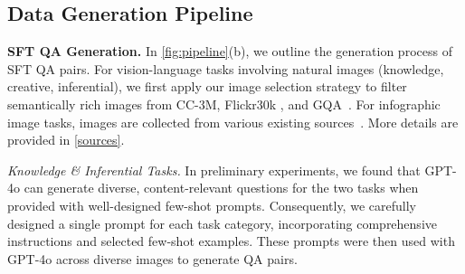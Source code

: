 
\subsection{Data Generation Pipeline}
\label{sec: sft generate}

\noindent\textbf{SFT QA Generation. } 
In \cref{fig:pipeline}(b), we outline the generation process of SFT QA pairs.
For vision-language tasks involving natural images (knowledge, creative, inferential), 
we first apply our image selection strategy to filter semantically rich images from CC-3M\cite{sharma2018conceptual}, Flickr30k \cite{plummer2015flickr30k}, and GQA~\cite{hudson2019gqa}.
For infographic image tasks, images are collected from various existing sources~\cite{masry2022chartqa,Li2018TextbookQA,kembhavi2016diagram}. 
More details are provided in \cref{sources}.


\textit{Knowledge \& Inferential Tasks. }
In preliminary experiments, we found that GPT-4o can generate diverse, content-relevant questions for the two tasks when provided with well-designed few-shot prompts. 
Consequently, we carefully designed a single prompt for each task category, incorporating comprehensive instructions and selected few-shot examples. 
These prompts were then used with GPT-4o across diverse images to generate QA pairs.


